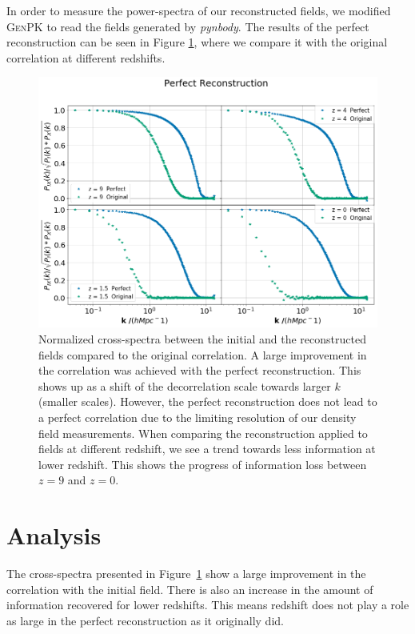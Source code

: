 
In order to measure the power-spectra of our reconstructed fields, we modified \textsc{GenPK} to read the fields generated by \textit{pynbody}. The results of the perfect reconstruction can be seen in Figure \ref{fig:3.2}, where we compare it with the original correlation at different redshifts. 

\begin{figure}
    \centering
    \includegraphics[width=1\columnwidth]{images/perfRecon/perfRecon.png}%
    
    \caption{
    Normalized cross-spectra between the initial and the reconstructed fields compared to the original correlation. A large improvement in the correlation was achieved with the perfect reconstruction. This shows up as a shift of the decorrelation scale towards larger $k$ (smaller scales). However, the perfect reconstruction does not lead to a perfect correlation due to the limiting resolution of our density field measurements. When comparing the reconstruction applied to fields at different redshift, we see a trend towards less information at lower redshift. This shows the progress of information loss between $z=9$ and $z=0$.
    }
    
    \label{fig:3.2}
\end{figure}

\section{Analysis}

The cross-spectra presented in Figure~\ref{fig:3.2} show a large improvement in the correlation with the initial field. There is also an increase in the amount of information recovered for lower redshifts. This means redshift does not play a role as large in the perfect reconstruction as it originally did. 

